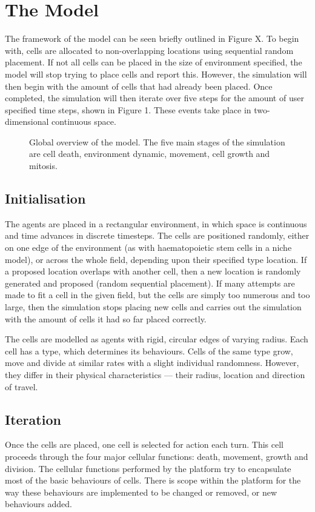 \documentclass[12pt]{article}
\begin{document}
\section{The Model}
The framework of the model can be seen briefly outlined in Figure X. To 
begin with, cells are allocated to non-overlapping locations using 
sequential random placement. If not all cells can be placed in the size 
of environment specified, the model will stop trying to place cells and 
report this. However, the simulation will then begin with the amount of 
cells that had already been placed. Once completed, the simulation will 
then iterate over five steps for the amount of user specified time 
steps, shown in Figure 1. These events take place in two-dimensional 
continuous space. 

\begin{figure}[H]
\centering
\caption[]{Global overview of the model. The five main stages 
of the simulation are cell death, environment dynamic, movement, cell 
growth and mitosis.}
\end{figure}

\subsection{Initialisation}
The agents are placed in a rectangular environment, in which space is 
continuous and time advances in discrete timesteps. The cells are 
positioned randomly, either on one edge of the environment (as with 
haematopoietic stem cells in a niche model), or across the whole field, 
depending upon their specified type location. If a proposed location 
overlaps with another cell, then a new location is randomly generated 
and proposed (random sequential placement). If many attempts are made to 
fit a cell in the given field, but the cells are simply too numerous and 
too large, then the simulation stops placing new cells and carries out 
the simulation with the amount of cells it had so far placed correctly.

The cells are modelled as agents with rigid, circular edges of varying 
radius. Each cell has a type, which determines its behaviours. Cells of 
the same type grow, move and divide at similar rates with a slight 
individual randomness. However, they differ in their physical 
characteristics --- their radius, location and direction of travel.

\subsection{Iteration}
Once the cells are placed, one cell is selected for action each turn. 
This cell proceeds through the four major cellular functions: death, 
movement, growth and division. The cellular functions performed by the 
platform try to encapsulate most of the basic behaviours of cells. There 
is scope within the platform for the way these behaviours are 
implemented to be changed or removed, or new behaviours added.
\end{document}
